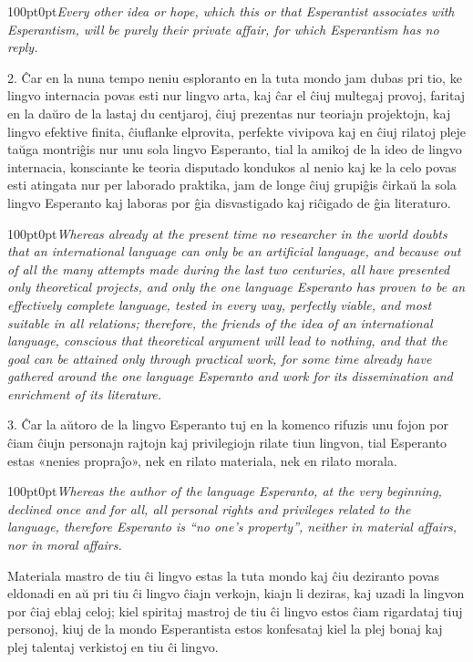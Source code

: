 \documentclass[11pt]{article}
\newcommand{\righty}[1]{\begin{adjustwidth}{100pt}{0pt}\it\traduko #1\end{adjustwidth}}
\begin{document}
\righty{Every other idea or hope, which this or that Esperantist associates with Esperantism, will be purely their private affair, for which Esperantism has no reply.}

2. Ĉar en la nuna tempo neniu esploranto en la tuta mondo jam dubas pri tio, ke lingvo internacia povas esti nur lingvo arta, kaj ĉar el ĉiuj multegaj provoj, faritaj en la daŭro de la lastaj du centjaroj, ĉiuj prezentas nur teoriajn projektojn, kaj lingvo efektive finita, ĉiuflanke elprovita, perfekte vivipova kaj en ĉiuj rilatoj pleje taŭga montriĝis nur unu sola lingvo Esperanto, tial la amikoj de la ideo de lingvo internacia, konsciante ke teoria disputado kondukos al nenio kaj ke la celo povas esti atingata nur per laborado praktika, jam de longe ĉiuj grupiĝis ĉirkaŭ la sola lingvo Esperanto kaj laboras por ĝia disvastigado kaj riĉigado de ĝia literaturo. 

\righty{Whereas already at the present time no researcher in the world doubts that an international language can only be an artificial language, and because out of all the many attempts made during the last two centuries, all have presented only theoretical projects, and only the one language Esperanto has proven to be an effectively complete language, tested in every way, perfectly viable, and most suitable in all relations; therefore, the friends of the idea of an international language, conscious that theoretical argument will lead to nothing, and that the goal can be attained only through practical work,  for some time already have gathered around the one language Esperanto and work for its dissemination and enrichment of its literature.}

3. Ĉar la aŭtoro de la lingvo Esperanto tuj en la komenco rifuzis unu fojon por ĉiam ĉiujn personajn rajtojn kaj privilegiojn rilate tiun lingvon, tial Esperanto estas «nenies propraĵo», nek en rilato materiala, nek en rilato morala. 

\righty{Whereas the author of the language Esperanto, at the very beginning, declined once and for all, all personal rights and privileges related to the language, therefore Esperanto is “no one’s property”, neither in material affairs, nor in moral affairs.}

Materiala mastro de tiu ĉi lingvo estas la tuta mondo kaj ĉiu deziranto povas eldonadi en aŭ pri tiu ĉi lingvo ĉiajn verkojn, kiajn li deziras, kaj uzadi la lingvon por ĉiaj eblaj celoj; kiel spiritaj mastroj de tiu ĉi lingvo estos ĉiam rigardataj tiuj personoj, kiuj de la mondo Esperantista estos konfesataj kiel la plej bonaj kaj plej talentaj verkistoj en tiu ĉi lingvo. 
\end{document}
